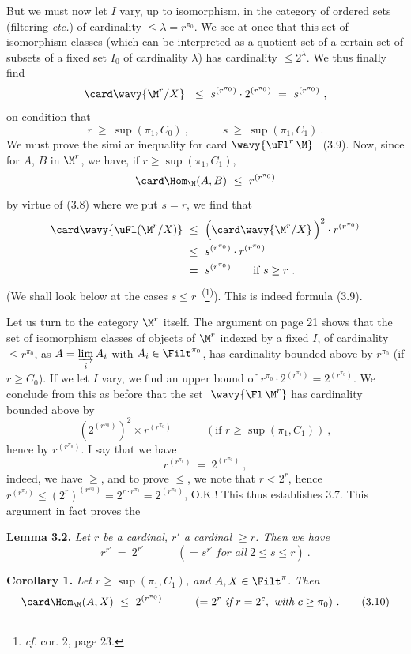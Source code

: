 But we must now let $I$ vary, up to isomorphism, in the category of ordered sets (filtering \textit{etc.}) of cardinality $\leq\lambda=r^{\pi_0}$. We see at once that this set of isomorphism classes (which can be interpreted as a quotient set of a certain set of subsets of a fixed set $I_0$ of cardinality $\lambda$) has cardinality $\leq 2^\lambda$. We thus finally find
\[
\card\wavy{\M^r/X}\ \ \leq\ s^{(r^{\pi_0})}\cdot 2^{(r^{\pi_0})}\ =\ s^{(r^{\pi_0})}\ ,
\]
on condition that
\[
r\ \geq\ \sup(\pi_1,C_0)\ ,\qquad\quad s\ \geq\ \sup(\pi_1,C_1)\ .
\]
We must prove the similar inequality for card $\wavy{\uFl^r\,\M}$ \ (3.9). Now, since for $A$, $B$ in $\M^r$, we have, if $r\geq\sup(\pi_1,C_1)$,
\[
\card\Hom_{\M}(A,B)\ \leq\ r^{(r^{\pi_0})}
\]
by virtue of (3.8) where we put $s=r$, we find that
\[
\begin{aligned}
\card\wavy{\uFl(\M^r/X)}\ &\leq\ \Bigl(\card\wavy{\M^r/X}\,\Bigr)^2\cdot r^{(r^{\pi_0})}\\
&\leq\ s^{(r^{\pi_0})}\cdot r^{(r^{\pi_0})}\\
&=\ s^{(r^{\pi_0})}\qquad\text{if } s\geq r\ .
\end{aligned}
\]
(We shall look below at the cases $s\leq r$~\textsuperscript{(}\footnote[8]{\textit{cf.} cor. 2, page 23.}\textsuperscript{)}). This is indeed formula (3.9).

Let us turn to the category $\M^r$ itself. The argument on page 21 shows that the set of isomorphism classes of objects of $\M^r$ indexed by a fixed $I$, of cardinality $\leq r^{\pi_0}$, as $A=\varinjlim\limits_i A_i$ with $A_i\in\Filt^{\pi_0}$, has cardinality bounded above by $r^{\pi_0}$ (if $r\geq C_0$). If we let $I$ vary, we find an upper bound of $r^{\pi_0}\cdot 2^{(r^{\pi_0})}=2^{(r^{\pi_0})}$. We conclude from this as before that the set $\ \wavy{\Fl\,\M^r}$ has cardinality bounded above by
\[
(2^{(r^{\pi_0})})^2\times r^{(r^{\pi_0})}\qquad\quad(\text{if } r\geq\sup(\pi_1,C_1))\ ,
\]
hence by $r^{(r^{\pi_0})}$. I say that we have
\[
r^{(r^{\pi_0})}\ =\ 2^{(r^{\pi_0})}\ ,
\]
indeed, we have $\geq$, and to prove $\leq$, we note that $r<2^r$, hence $r^{(r^{\pi_0})}\leq(2^r)^{(r^{\pi_0})}=2^{r\cdot r^{\pi_0}}=2^{(r^{\pi_0})}$, O.K.! This thus establishes 3.7. This argument in fact proves the

\textbf{Lemma 3.2.} \textit{Let $r$ be a cardinal, $r'$ a cardinal $\geq r$. Then we have}
\[
r^{r'}\ =\ 2^{r'}\qquad\quad(=s^{r'}\ \textit{for all}\ 2\leq s\leq r)\ .
\]

\textbf{Corollary 1.} \textit{Let $r\geq\sup(\pi_1,C_1)$, and $A,X\in\Filt^\pi$. Then}
\[
\card\Hom_{\M}(A,X)\ \leq\ 2^{(r^{\pi_0})}\qquad\quad(=2^r\ \textit{if}\ r=2^c,\ \textit{with}\ c\geq\pi_0)\ . \tag*{(3.10)}
\]

